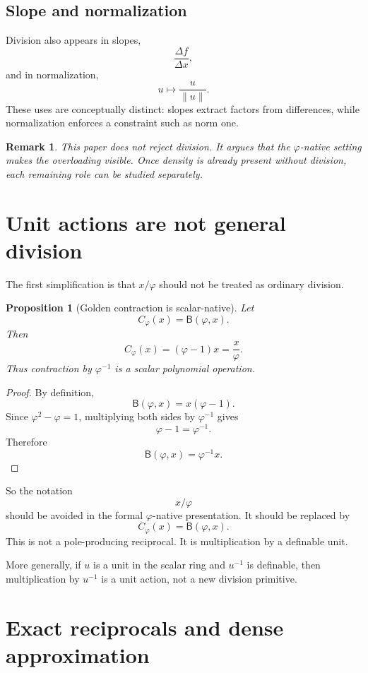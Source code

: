 \documentclass[11pt]{article}
\newtheorem{proposition}[definition]{Proposition}
\newtheorem{remark}[definition]{Remark}
\newcommand{\B}{\mathsf{B}}
\newcommand{\ph}{\varphi}
\begin{document}
\subsection{Slope and normalization}

Division also appears in slopes,
\[
    \frac{\Delta f}{\Delta x},
\]
and in normalization,
\[
    u\mapsto \frac{u}{\|u\|}.
\]
These uses are conceptually distinct: slopes extract factors from differences, while normalization enforces a constraint such as norm one.

\begin{remark}
This paper does not reject division.  It argues that the $\ph$-native setting makes the overloading visible.  Once density is already present without division, each remaining role can be studied separately.
\end{remark}

\section{Unit actions are not general division}

The first simplification is that $x/\ph$ should not be treated as ordinary division.

\begin{proposition}[Golden contraction is scalar-native]
Let
\[
    C_\ph(x)=\B(\ph,x).
\]
Then
\[
    C_\ph(x)=(\ph-1)x=\frac{x}{\ph}.
\]
Thus contraction by $\ph^{-1}$ is a scalar polynomial operation.
\end{proposition}

\begin{proof}
By definition,
\[
    \B(\ph,x)=x(\ph-1).
\]
Since $\ph^2-\ph=1$, multiplying both sides by $\ph^{-1}$ gives
\[
    \ph-1=\ph^{-1}.
\]
Therefore
\[
    \B(\ph,x)=\ph^{-1}x.
\]
\end{proof}

So the notation
\[
    x/\ph
\]
should be avoided in the formal $\ph$-native presentation.  It should be replaced by
\[
    C_\ph(x)=\B(\ph,x).
\]
This is not a pole-producing reciprocal.  It is multiplication by a definable unit.

More generally, if $u$ is a unit in the scalar ring and $u^{-1}$ is definable, then multiplication by $u^{-1}$ is a unit action, not a new division primitive.

\section{Exact reciprocals and dense approximation}
\end{document}
